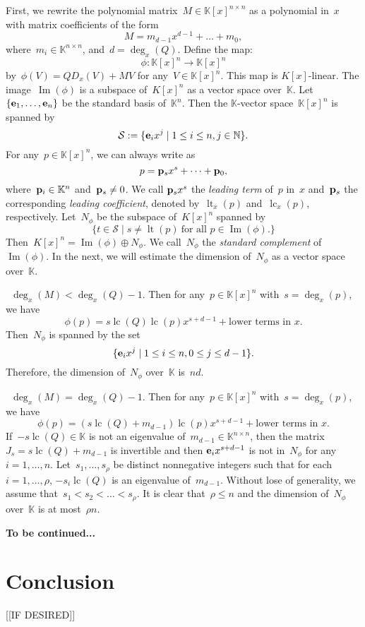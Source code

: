 \documentclass{sig-alternate}
\newcommand{\red}{\color{red}}
\newcommand{\bN}{ {\mathbb N}}
\newcommand{\bK}{ {\mathbb K}}
\newcommand{\cS}{ {\mathcal S}}
\newcommand{\ve} {{\bf e}}
\newcommand{\vp} {{\bf p}}
\def\lc{\operatorname{lc}}
\def\lt{\operatorname{lt}}
\def\im{\operatorname{Im}}
\begin{document}
First, we rewrite the polynomial matrix~$M\in \bK[x]^{n\times n}$ as a polynomial in~$x$
with matrix coefficients of the form
\[M = m_{d-1}x^{d-1} + \ldots + m_0, \]
where~$m_i\in \bK^{n\times n}$, and~$d = \deg_x(Q)$. Define the map:
\[\phi: \bK[x]^n \rightarrow \bK[x]^n\]
by~$\phi(V)= QD_x(V) + MV$ for any~$V\in \bK[x]^n$. This map is $K[x]$-linear.
The image~$\im(\phi)$ is a subspace of~$K[x]^n$ as a vector space over~$\bK$.
Let~$\{\ve_1, \ldots, \ve_n\}$ be the standard basis of~$\bK^n$. Then the $\bK$-vector space~$\bK[x]^n$
is spanned by
\[\cS := \{\ve_ix^j \mid 1\leq i \leq n, j\in \bN\}.\]
For any~$p \in \bK[x]^n$, we can always write as
\[p = \vp_sx^s + \cdots + \vp_0,\]
where~$\vp_i\in \bK^n$ and~$\vp_s \neq 0$. We call $\vp_sx^s$
the \emph{leading term} of~$p$ in~$x$ and~$\vp_s$ the corresponding \emph{leading coefficient},
denoted by~$\lt_x(p)$ and~$\lc_x(p)$, respectively.
Let~$N_\phi$ be the subspace of~$K[x]^n$ spanned by
\[\{t \in \cS \mid s\neq \lt(p) ~\text{for all~$p\in \im(\phi)$}. \}\]
Then~$K[x]^n = \im(\phi) \oplus N_\phi$.
We call~$N_{\phi}$ the \emph{standard complement} of~$\im(\phi)$.
In the next, we will estimate the dimension of~$N_\phi$ as a vector space over~$\bK$.

{\red  {\bf This part is to be revised!!!} ~$\deg_x(M)<\deg_x(Q)-1$. Then for any~$p\in \bK[x]^n$ with~$s=\deg_x(p)$, we have
\[\phi(p) = s\lc(Q)\lc(p)x^{s+d-1}+\text{lower terms in~$x$}.\]
Then~$N_\phi$ is spanned by the set
\[\{\ve_ix^j \mid 1\leq i \leq n, 0\leq j \leq d-1\}.\]
Therefore, the dimension of~$N_{\phi}$ over~$\bK$ is~$nd$.

~$\deg_x(M)=\deg_x(Q)-1$. Then for any~$p\in \bK[x]^n$ with~$s=\deg_x(p)$, we have
\[\phi(p) = (s\lc(Q) + m_{d-1})\lc(p)x^{s+d-1}+\text{lower terms in~$x$}.\]
If~$-s\lc(Q)\in \bK$ is not an eigenvalue of~$m_{d-1}\in \bK^{n\times n}$, then
the matrix~$J_s = s\lc(Q) + m_{d-1}$ is invertible and then $\ve_ix^{s+d-1}$ is not in~$N_\phi$
for any~$i=1, \ldots, n$. Let~$s_1, \ldots, s_\rho$ be distinct nonnegative integers such that
for each~$i=1, \ldots, \rho$, $-s_i\lc(Q)$ is an eigenvalue of~$m_{d-1}$. Without lose of generality,
we assume that~$s_1 <s_2<\ldots<s_\rho$. It is clear that~$\rho \leq n$
and the dimension of~$N_{\phi}$ over~$\bK$ is at most~$\rho n$.

{\bf To be continued...}}

\section{Conclusion}

[[IF DESIRED]]



\end{document}

